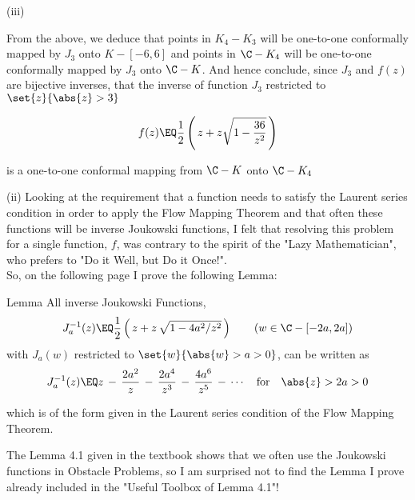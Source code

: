 \documentclass[english,a4paper,11pt]{scrartcl}
\begin{document}
\begin{labeling}{(iii) }
\begin{itemize}
\end{itemize}

From the above, we deduce that points in $K_4 - K_3$ will be one-to-one conformally mapped by $J_3$ onto $K - [-6,6]$ and points in $\C - K_4$ will be one-to-one conformally mapped by $J_3$ onto $\C - K$. And hence conclude, since $J_3$ and $f(z)$ are bijective inverses, that the inverse of function $J_3$ restricted to  $\set{z}{\abs{z} > 3}$
 \\

\begin{Answer}  
\[ f(z) \EQ \frac1{2} \left(\, z + z \sqrt{1 - \frac{36}{z^2}} \,\right) \]

is a one-to-one conformal mapping from $\C - K$ onto $\C - K_4$
\end{Answer}

  
\newpage  

  \item [(ii)]  Looking at the requirement that a function needs to satisfy the Laurent series condition in order to apply the Flow Mapping Theorem and that often these functions will be inverse Joukowski functions, I felt that resolving this problem for a single function, $f$, was contrary to the spirit of the "Lazy Mathematician", who prefers to "Do it Well, but Do it Once!".\\

\bigskip  
So, on the following page I prove the following Lemma: \\

\bigskip
\begin{TextBox} {Lemma}
All inverse Joukowski Functions, 
\[ J_a^{-1}(z) \EQ \frac1{2} \left(\,z + z \, \sqrt{1 - 4a^2/z^2} \,\right)   \qquad (w \in \C - [-2a,2a]) \]
with $J_a(w)$ restricted to $\set{w}{\abs{w} > a > 0}$, can be written as
%
\[ J_a^{-1}(z) \EQ z \,-\, \frac{2a^2}{z} \,-\, \frac{2a^4}{z^3} \,-\,  \frac{4a^6}{z^5}  \,-\, \cdots \quad \text{for} \quad \abs{z} > 2a > 0 \]

which is of the form given in the Laurent series condition of the Flow Mapping Theorem. \\
\end{TextBox}

\bigskip
The Lemma 4.1 given in the textbook shows that we often use the Joukowski functions in Obstacle Problems, so I am surprised not to find the Lemma I prove already included in the "Useful Toolbox of Lemma 4.1"!






\end{labeling}
\end{document}
